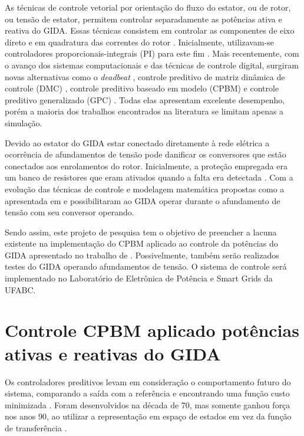 	As técnicas de controle vetorial por orientação do fluxo do estator, ou de rotor, ou tensão de estator, permitem controlar separadamente as potências ativa e reativa do GIDA. Essas técnicas consistem em controlar as componentes de eixo direto e em quadratura das correntes do rotor \cite{murilodq,eixodqmonografia}. Inicialmente, utilizavam-se controladores proporcionais-integrais (PI) para este fim \cite{alfeu}. Mais recentemente, com o avanço dos sistemas computacionais e das técnicas de controle digital, surgiram novas alternativas como o \emph{deadbeat} \cite{deadbeat,deadbeatieee}, controle preditivo de matriz dinâmica de controle (DMC) \cite{dmcieee}, controle preditivo baseado em modelo (CPBM) \cite{alfeu,paperalfeu} e controle preditivo generalizado (GPC) \cite{gpcieee}. Todas elas apresentam excelente desempenho, porém a maioria dos trabalhos encontrados na literatura se limitam apenas a simulação.
	
	Devido ao estator do GIDA estar conectado diretamente à rede elétrica a ocorrência de afundamentos de tensão pode danificar os conversores que estão conectados aos enrolamentos do rotor. Inicialmente, a proteção empregada era um banco de resistores que eram ativados quando a falta era detectada \cite{rodrigo8afundamento,rodrigo9afundamento, rodrigoquedatensao}. Com a evolução das técnicas de controle e modelagem matemática propostas como a apresentada em   e  possibilitaram ao GIDA operar durante o afundamento de tensão com seu conversor operando.
	
	Sendo assim, este projeto de pesquisa tem o objetivo de preencher a lacuna existente na implementação do CPBM aplicado ao controle da potências do GIDA apresentado no trabalho de . Possivelmente, também serão realizados testes do GIDA operando afundamentos de tensão. O sistema de controle será implementado no Laboratório de Eletrônica de Potência e Smart Grids da UFABC.
	
	\begingroup
		\let\clearpage\relax
		\chapter{Controle CPBM aplicado potências ativas e reativas do GIDA}
		\label{capitulo:teoria}
	\endgroup
	
	Os controladores preditivos levam em consideração o comportamento futuro do sistema, comparando a saída com a referência e encontrando uma função custo minimizada \cite{camachoteoriapreditivomodelo,rositierteoriapreditivomodelo,wangpreditivo}. Foram desenvolvidos na década de 70, mas somente ganhou força nos anos 90, ao utilizar a representação em espaço de estados em vez da função de transferência \cite{historicopreditivo}.
	
